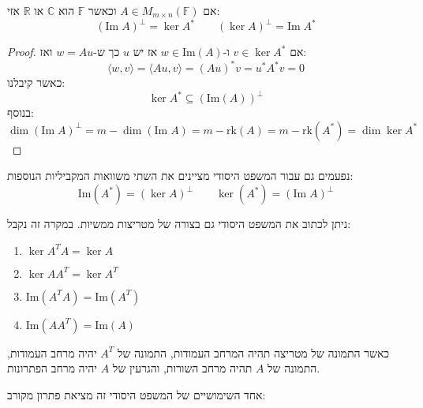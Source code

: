 \documentclass{tstextbook}
\begin{document}
\begin{theorem}
אם \(A\in M_{m\times n}\left( \mathbb{F}  \right)\) וכאשר \(\mathbb{F}\) הוא \(\mathbb{C}\) או \(\mathbb{R}\) אזי:
$$\left( \mathrm{Im}\;A \right)^{\perp} = \ker  A^{*}\qquad \left( \ker A \right)^{\perp}=\mathrm{Im}\;A^{*}$$

\end{theorem}
\begin{proof}
אם \(v \in \ker A^{*}\) ו-\(w \in \mathrm{Im}(A)\) אז יש \(u\) כך ש-\(w=Au\) ואז:
$$\langle w,v \rangle =\langle Au,v \rangle =(Au)^{*}v=u^{*}A^{*}v=0$$
כאשר קיבלנו:
$$\ker  A^{*}\subseteq \left( \mathrm{Im}(A) \right)^{\perp}$$
בנוסף:
$$\dim\left( \mathrm{Im}\;A \right)^{\perp}=m-\dim\left( \mathrm{Im}\;A \right)=m-\mathrm{rk}(A)=m-\mathrm{rk}(A^{*})=\dim \ker A^{*}$$

\end{proof}
\begin{remark}
נפעמים גם עבור המשפט היסודי מציינים את השתי משוואות המקביליות הנוספות:
$$\mathrm{Im}(A^{*})=\left( \ker A \right)^{\perp}\qquad \ker (A^{*})=\left( \mathrm{Im}\;A \right)^{\perp}$$

\end{remark}
\begin{remark}
ניתן לכתוב את המשפט היסודי גם בצורה של מטריצות ממשיות. במקרה זה נקבל:

  \begin{enumerate}
    \item \(\ker A^{T}A=\ker A\)


    \item \(\ker AA^{T}=\ker A^{T}\)


    \item \(\mathrm{Im}(A^{T} A)=\mathrm{Im}(A^{T})\)


    \item \(\mathrm{Im}(AA^{T})=\mathrm{Im}(A)\)


  \end{enumerate}
\end{remark}
כאשר התמונה של מטריצה תהיה המרחב העמודות, התמונה של \(A^{T}\) יהיה מרחב העמודות, התמונה של \(A\) תהיה מרחב השורות, והגרעין של \(A\) יהיה מרחב הפתרונות.

אחד השימושיים של המשפט היסודי זה מציאת פתרון מקורב:
\end{document}
